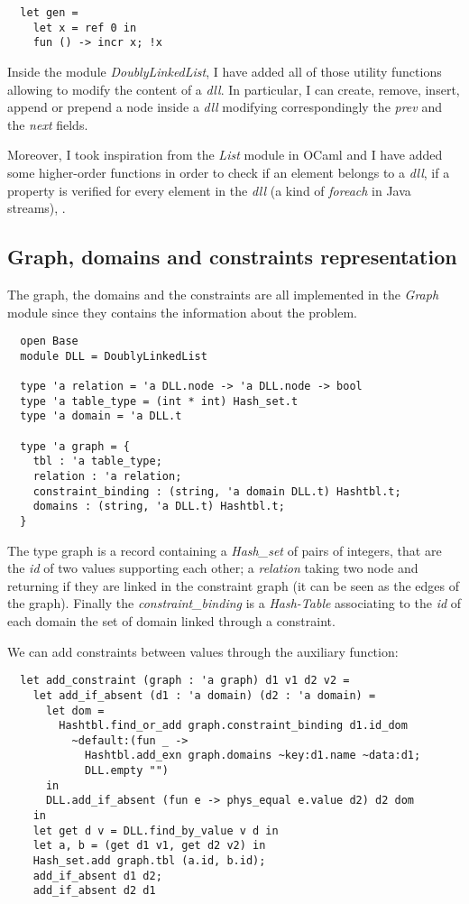 \documentclass{rapport}
\begin{document}
\begin{verbatim}
  let gen =
    let x = ref 0 in
    fun () -> incr x; !x
\end{verbatim}

Inside the module \textit{DoublyLinkedList}, I have added all of those utility functions allowing to modify the content of a \textit{dll}. In particular, I can create, remove, insert, append or prepend a node inside a \textit{dll} modifying correspondingly the \textit{prev} and the \textit{next} fields.

Moreover, I took inspiration from the \textit{List} module in OCaml and I have added some higher-order functions in order to check if an element belongs to a \textit{dll}, if a property is verified for every element in the \textit{dll} (a kind of \textit{foreach} in Java streams), \etc.

\subsection{Graph, domains and constraints representation}

The graph, the domains and the constraints are all implemented in the \textit{Graph} module since they contains the information about the problem.

\begin{verbatim}
  open Base
  module DLL = DoublyLinkedList
  
  type 'a relation = 'a DLL.node -> 'a DLL.node -> bool
  type 'a table_type = (int * int) Hash_set.t
  type 'a domain = 'a DLL.t
  
  type 'a graph = {
    tbl : 'a table_type;
    relation : 'a relation;
    constraint_binding : (string, 'a domain DLL.t) Hashtbl.t;
    domains : (string, 'a DLL.t) Hashtbl.t;
  }
\end{verbatim}

The type graph is a record containing a \textit{Hash\_set} of pairs of integers, that are the \textit{id} of two values supporting each other; a \textit{relation} taking two node and returning if they are linked in the constraint graph (it can be seen as the edges of the graph). Finally the \textit{constraint\_binding} is a \textit{Hash-Table} associating to the \textit{id} of each domain the set of domain linked through a constraint.

We can add constraints between values through the auxiliary function:

\begin{verbatim}
  let add_constraint (graph : 'a graph) d1 v1 d2 v2 =
    let add_if_absent (d1 : 'a domain) (d2 : 'a domain) =
      let dom =
        Hashtbl.find_or_add graph.constraint_binding d1.id_dom
          ~default:(fun _ ->
            Hashtbl.add_exn graph.domains ~key:d1.name ~data:d1;
            DLL.empty "")
      in
      DLL.add_if_absent (fun e -> phys_equal e.value d2) d2 dom
    in
    let get d v = DLL.find_by_value v d in
    let a, b = (get d1 v1, get d2 v2) in
    Hash_set.add graph.tbl (a.id, b.id);
    add_if_absent d1 d2;
    add_if_absent d2 d1
\end{verbatim}
\end{document}
